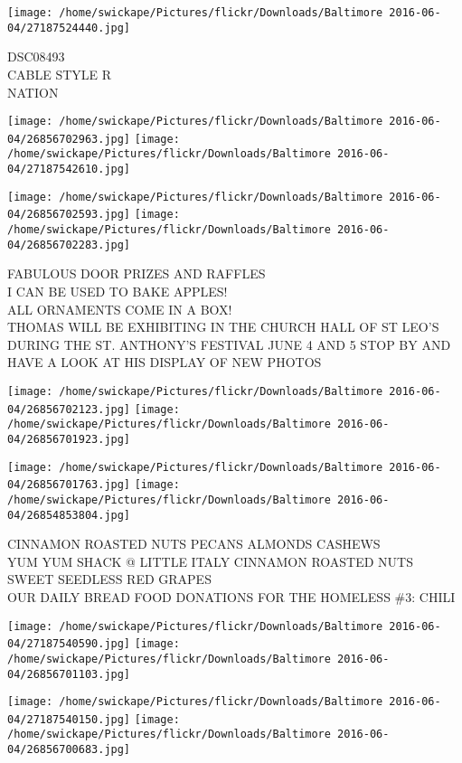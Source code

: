 \documentclass[10pt,letterpaper]{article}
\begin{document}
\vspace{0.25in}
\texttt{[image: /home/swickape/Pictures/flickr/Downloads/Baltimore 2016-06-04/27187524440.jpg]}

DSC08493\\
CABLE STYLE R\\
NATION
\pagebreak

\texttt{[image: /home/swickape/Pictures/flickr/Downloads/Baltimore 2016-06-04/26856702963.jpg]}
\texttt{[image: /home/swickape/Pictures/flickr/Downloads/Baltimore 2016-06-04/27187542610.jpg]}

\texttt{[image: /home/swickape/Pictures/flickr/Downloads/Baltimore 2016-06-04/26856702593.jpg]}
\texttt{[image: /home/swickape/Pictures/flickr/Downloads/Baltimore 2016-06-04/26856702283.jpg]}

FABULOUS DOOR PRIZES AND RAFFLES\\
I CAN BE USED TO BAKE APPLES!\\
ALL ORNAMENTS COME IN A BOX!\\
THOMAS WILL BE EXHIBITING IN THE CHURCH HALL OF ST LEO'S DURING THE ST. ANTHONY'S FESTIVAL JUNE 4 AND 5 STOP BY AND HAVE A LOOK AT HIS DISPLAY OF NEW PHOTOS
\pagebreak

\texttt{[image: /home/swickape/Pictures/flickr/Downloads/Baltimore 2016-06-04/26856702123.jpg]}
\texttt{[image: /home/swickape/Pictures/flickr/Downloads/Baltimore 2016-06-04/26856701923.jpg]}

\texttt{[image: /home/swickape/Pictures/flickr/Downloads/Baltimore 2016-06-04/26856701763.jpg]}
\texttt{[image: /home/swickape/Pictures/flickr/Downloads/Baltimore 2016-06-04/26854853804.jpg]}

CINNAMON ROASTED NUTS PECANS ALMONDS CASHEWS\\
YUM YUM SHACK @ LITTLE ITALY CINNAMON ROASTED NUTS\\
SWEET SEEDLESS RED GRAPES\\
OUR DAILY BREAD FOOD DONATIONS FOR THE HOMELESS \#3: CHILI
\pagebreak

\texttt{[image: /home/swickape/Pictures/flickr/Downloads/Baltimore 2016-06-04/27187540590.jpg]}
\texttt{[image: /home/swickape/Pictures/flickr/Downloads/Baltimore 2016-06-04/26856701103.jpg]}

\texttt{[image: /home/swickape/Pictures/flickr/Downloads/Baltimore 2016-06-04/27187540150.jpg]}
\texttt{[image: /home/swickape/Pictures/flickr/Downloads/Baltimore 2016-06-04/26856700683.jpg]}
\end{document}
